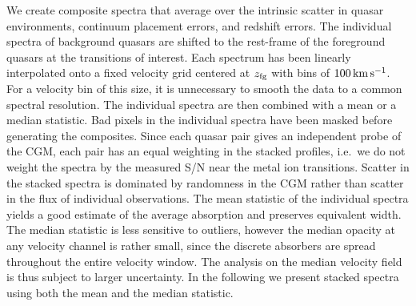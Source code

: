 \documentclass[iop]{emulateapj}
\begin{document}
We create composite spectra that average over the intrinsic scatter in quasar environments, 
continuum placement errors, and redshift errors. The individual spectra of background quasars are 
shifted to the rest-frame of the foreground quasars at the transitions of interest. Each spectrum 
has been linearly interpolated onto a fixed velocity grid centered at $z_{\rm fg}$ with bins of 
$100\,{\rm km\,s^{-1}}$. For a velocity bin of this size, it is unnecessary to smooth the data to 
a common spectral resolution. The individual spectra are then combined with a mean or a median 
statistic. Bad pixels in the individual spectra have been masked before generating the 
composites. Since each quasar pair gives an independent probe of the CGM, each pair has an equal 
weighting in the stacked profiles, i.e.\ we do not weight the spectra by the measured S/N near the 
metal ion transitions. Scatter in the stacked spectra is dominated by randomness in the CGM rather 
than scatter in the flux of individual observations. The mean statistic of the individual spectra 
yields a good estimate of the average absorption and preserves equivalent width. The median 
statistic is less sensitive to outliers, however the median opacity at any velocity channel is 
rather small, since the discrete absorbers are spread throughout the entire velocity window. The 
analysis on the median velocity field is thus subject to larger uncertainty. In the following we 
present stacked spectra using both the mean and the median statistic. 
\end{document}
